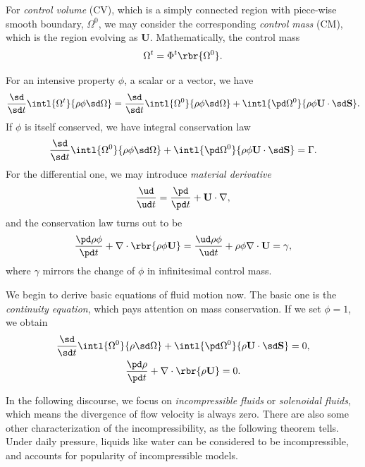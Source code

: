 \documentclass[english, nochinese]{pkupaper}
\begin{document}
For \emph{control volume} (CV), which is a simply connected region with piece-wise smooth boundary, $\Omega^0$, we may consider the corresponding \emph{control mass} (CM), which is the region evolving as $\mathbf{U}$. Mathematically, the control mass
\begin{equation}
\Omega^t = \Phi^t \rbr{\Omega^0}.
\end{equation}

For an intensive property $\phi$, a scalar or a vector, we have
\begin{equation}
\frac{\sd}{ \sd t } \intl{\Omega^t}{ \rho \phi \sd \Omega } = \frac{\sd}{ \sd t } \intl{\Omega^0}{ \rho \phi \sd \Omega } + \intl{ \pd \Omega^0 }{ \rho \phi \mathbf{U} \cdot \sd \mathbf{S} }.
\end{equation}
If $\phi$ is itself conserved, we have integral conservation law
\begin{equation}
\frac{\sd}{ \sd t } \intl{\Omega^0}{ \rho \phi \sd \Omega } + \intl{ \pd \Omega^0 }{ \rho \phi \mathbf{U} \cdot \sd \mathbf{S} } = \Gamma.
\end{equation}
For the differential one, we may introduce \emph{material derivative}
\begin{equation}
\frac{\ud}{ \ud t } = \frac{\pd}{ \pd t } + \mathbf{U} \cdot \nabla,
\end{equation}
and the conservation law turns out to be
\begin{equation}
\frac{ \pd \rho \phi }{ \pd t } + \nabla \cdot \rbr{ \rho \phi \mathbf{U} } = \frac{ \ud \rho \phi }{ \ud t } + \rho \phi \nabla \cdot \mathbf{U} = \gamma,
\end{equation}
where $\gamma$ mirrors the change of $\phi$ in infinitesimal control mass.

We begin to derive basic equations of fluid motion now. The basic one is the \emph{continuity equation}, which pays attention on mass conservation. If we set $ \phi = 1 $, we obtain
\begin{gather}
\frac{\sd}{ \sd t } \intl{\Omega^0}{ \rho \sd \Omega } + \intl{ \pd \Omega^0 }{ \rho \mathbf{U} \cdot \sd \mathbf{S} } = 0, \\
\frac{ \pd \rho }{ \pd t } + \nabla \cdot \rbr{ \rho \mathbf{U} } = 0.
\end{gather}

In the following discourse, we focus on \emph{incompressible fluids} or \emph{solenoidal fluids}, which means the divergence of flow velocity is always zero. There are also some other characterization of the incompressibility, as the following theorem tells. Under daily pressure, liquids like water can be considered to be incompressible, and accounts for popularity of incompressible models. 
\end{document}

